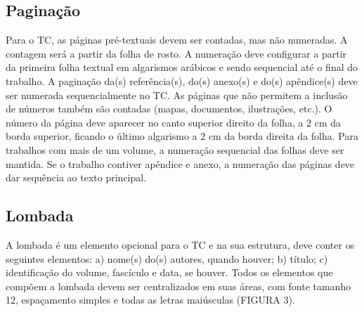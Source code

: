 \documentclass[12pt, openright, oneside, a4paper, brazil]{abntex2}
\begin{document}
\subsection{Paginação}

Para o TC, as páginas pré-textuais devem ser contadas, mas não numeradas. A contagem será a partir da folha de rosto. A numeração deve configurar a partir da primeira folha textual em algarismos arábicos e sendo sequencial até o final do trabalho. 
A paginação da(s) referência(s), do(s) anexo(s) e do(s) apêndice(s) deve ser numerada sequencialmente no TC. As páginas que não permitem a inclusão de números também são contadas (mapas, documentos, ilustrações, etc.).
O número da página deve aparecer no canto superior direito da folha, a 2 cm da borda superior, ficando o último algarismo a 2 cm da borda direita da folha.
Para trabalhos com mais de um volume, a numeração sequencial das folhas deve ser mantida. Se o trabalho contiver apêndice e anexo, a numeração das páginas deve dar sequência ao texto principal.

\subsection{Lombada}

A lombada é um elemento opcional para o TC e na sua estrutura, deve conter os seguintes elementos: 
a)	nome(s) do(s) autores, quando houver;
b)	título;
c)	identificação do volume, fascículo e data, se houver.
Todos os elementos que compõem a lombada devem ser centralizados em suas áreas, com fonte tamanho 12, espaçamento simples e todas as letras maiúsculas (FIGURA 3).
\end{document}
